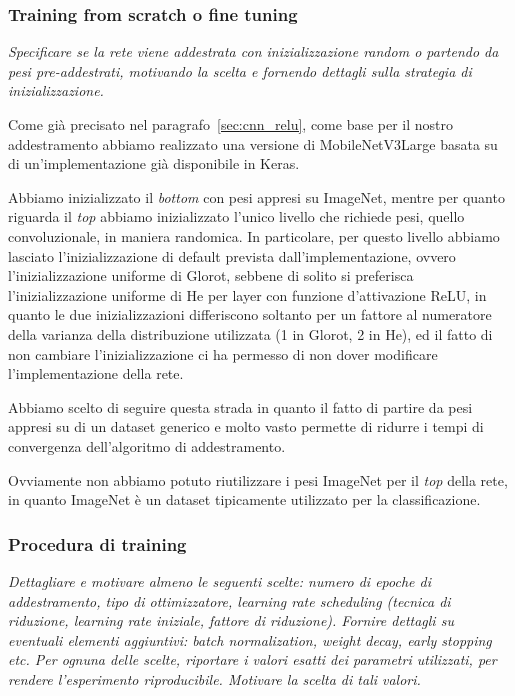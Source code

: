 \subsubsection{Training from scratch o fine tuning}
\emph{Specificare se la rete viene addestrata con inizializzazione random o partendo da pesi pre-addestrati, motivando la scelta e fornendo dettagli sulla strategia di inizializzazione.}

Come già precisato nel paragrafo~\ref{sec:cnn_relu}, come base per il nostro addestramento abbiamo realizzato una versione di MobileNetV3Large basata su di un'implementazione già disponibile in Keras. 

Abbiamo inizializzato il \emph{bottom} con pesi appresi su ImageNet, mentre per quanto riguarda il \emph{top} abbiamo inizializzato l'unico livello che richiede pesi, quello convoluzionale, in maniera randomica. In particolare, per questo livello abbiamo lasciato l'inizializzazione di default prevista dall'implementazione, ovvero l'inizializzazione uniforme di Glorot, sebbene di solito si preferisca l'inizializzazione uniforme di He per layer con funzione d'attivazione ReLU, in quanto le due inizializzazioni differiscono soltanto per un fattore al numeratore della varianza della distribuzione utilizzata (1 in Glorot, 2 in He), ed il fatto di non cambiare l'inizializzazione ci ha permesso di non dover modificare l'implementazione della rete.

Abbiamo scelto di seguire questa strada in quanto il fatto di partire da pesi appresi su di un dataset generico e molto vasto permette di ridurre i tempi di convergenza dell'algoritmo di addestramento\cite{miviaage}. 

Ovviamente non abbiamo potuto riutilizzare i pesi ImageNet per il \emph{top} della rete, in quanto ImageNet è un dataset tipicamente utilizzato per la classificazione.

\subsubsection{Procedura di training}
\emph{Dettagliare e motivare almeno le seguenti scelte: numero di epoche di addestramento, tipo di ottimizzatore, learning rate scheduling (tecnica di riduzione, learning rate iniziale, fattore di riduzione). Fornire dettagli su eventuali elementi aggiuntivi: batch normalization, weight decay, early stopping etc. Per ognuna delle scelte, riportare i valori esatti dei parametri utilizzati, per rendere l’esperimento riproducibile. Motivare la scelta di tali valori.}